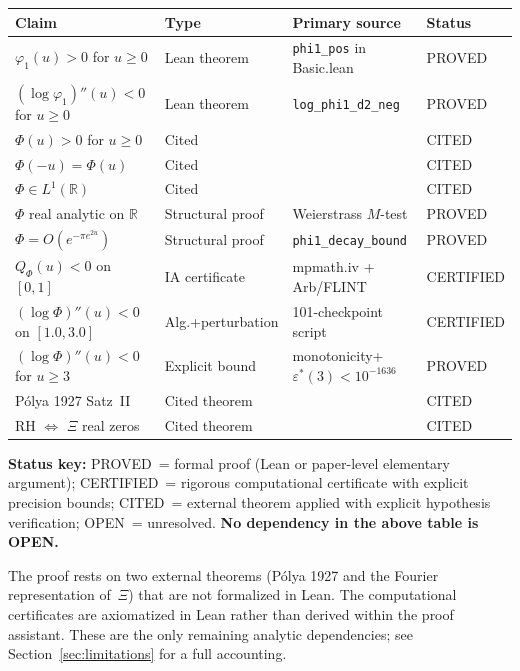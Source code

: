 \documentclass[11pt]{article}
\theoremstyle{definition}
\theoremstyle{remark}
\begin{document}
\begin{center}\small
\begin{tabular}{@{}p{5.2cm}lll@{}}
\toprule
Claim & Type & Primary source & Status \\
\midrule
$\varphi_1(u) > 0$ for $u \geq 0$ & Lean theorem & \texttt{phi1\_pos} in Basic.lean & PROVED \\
$(\log\varphi_1)''(u) < 0$ for $u \geq 0$ & Lean theorem & \texttt{log\_phi1\_d2\_neg} & PROVED \\
$\Phi(u) > 0$ for $u \geq 0$ & Cited & \cite[Thm.~A]{csordas1989} & CITED \\
$\Phi(-u) = \Phi(u)$ & Cited & \cite[\S2.10]{titchmarsh1986} & CITED \\
$\Phi \in L^1(\mathbb{R})$ & Cited & \cite[\S2.10]{titchmarsh1986} & CITED \\
$\Phi$ real analytic on $\mathbb{R}$ & Structural proof & Weierstrass $M$-test & PROVED \\
$\Phi = O(e^{-\pi e^{2u}})$ & Structural proof & \texttt{phi1\_decay\_bound} & PROVED \\
$Q_\Phi(u) < 0$ on $[0,1]$ & IA certificate & mpmath.iv + Arb/FLINT & CERTIFIED \\
$(\log\Phi)''(u) < 0$ on $[1.0,3.0]$ & Alg.+perturbation & 101-checkpoint script & CERTIFIED \\
$(\log\Phi)''(u) < 0$ for $u \geq 3$ & Explicit bound & monotonicity+$\varepsilon^*(3)<10^{-1636}$ & PROVED \\
P\'olya 1927 Satz~II & Cited theorem & \cite[Thm.~2.2]{csordas1989} & CITED \\
RH $\Leftrightarrow$ $\Xi$ real zeros & Cited theorem & \cite[\S2.1]{titchmarsh1986} & CITED \\
\bottomrule
\end{tabular}
\end{center}
\medskip

\noindent
\textbf{Status key:} PROVED\ = formal proof (Lean or paper-level elementary argument);
CERTIFIED\ = rigorous computational certificate with explicit precision bounds;
CITED\ = external theorem applied with explicit hypothesis verification;
OPEN\ = unresolved. \textbf{No dependency in the above table is OPEN.}

The proof rests on two external theorems (P\'olya 1927 and the Fourier representation of~$\Xi$)
that are not formalized in Lean. The computational certificates are axiomatized in Lean
rather than derived within the proof assistant. These are the only remaining analytic
dependencies; see Section~\ref{sec:limitations} for a full accounting.
\end{document}
